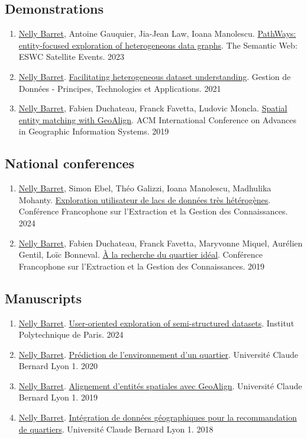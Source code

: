 \documentclass{article}
\begin{document}
\subsection*{Demonstrations}
\begin{enumerate}[resume]
\item \underline{Nelly Barret}, Antoine Gauquier, Jia-Jean Law, Ioana Manolescu. \href{https://hal.science/hal-04131977}{PathWays: entity-focused exploration of heterogeneous data graphs}. The Semantic Web: ESWC Satellite Events. 2023
\item \underline{Nelly Barret}. \href{https://hal.science/hal-03344102/document}{Facilitating heterogeneous dataset understanding}. Gestion de Données - Principes, Technologies et Applications. 2021
\item \underline{Nelly Barret}, Fabien Duchateau, Franck Favetta, Ludovic Moncla. \href{https://hal.science/hal-05388560}{Spatial entity matching with GeoAlign}. ACM International Conference on Advances in Geographic Information Systems. 2019
\end{enumerate}
\subsection*{National conferences}
\begin{enumerate}[resume]
\item \underline{Nelly Barret}, Simon Ebel, Théo Galizzi, Ioana Manolescu, Madhulika Mohanty. \href{https://hal.science/hal-04388609}{Exploration utilisateur de lacs de données très hétérogènes}. Conférence Francophone sur l'Extraction et la Gestion des Connaissances. 2024
\item \underline{Nelly Barret}, Fabien Duchateau, Franck Favetta, Maryvonne Miquel, Aurélien Gentil, Loïc Bonneval. \href{https://editions-rnti.fr/?inprocid=1002526}{À la recherche du quartier idéal}. Conférence Francophone sur l'Extraction et la Gestion des Connaissances. 2019
\end{enumerate}
\subsection*{Manuscripts}
\begin{enumerate}[resume]
\item \underline{Nelly Barret}. \href{https://theses.fr/2024IPPAX001}{User-oriented exploration of semi-structured datasets}. Institut Polytechnique de Paris. 2024
\item \underline{Nelly Barret}. \href{https://zenodo.org/records/17679906}{Prédiction de l'environnement d'un quartier}. Université Claude Bernard Lyon 1. 2020
\item \underline{Nelly Barret}. \href{https://zenodo.org/records/17679892}{Alignement d'entités spatiales avec GeoAlign}. Université Claude Bernard Lyon 1. 2019
\item \underline{Nelly Barret}. \href{https://zenodo.org/records/17679854}{Intégration de données géographiques pour la recommandation de quartiers}. Université Claude Bernard Lyon 1. 2018
\end{enumerate}
\end{document}
